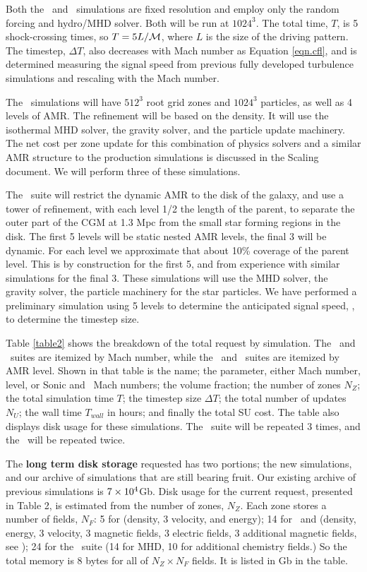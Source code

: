 Both the \nameTurbulence\ and \nameCMB\ simulations are fixed resolution and
employ only the random forcing and hydro/MHD solver.    Both will be
run at $1024^3$.  The total time, $T$, is 5 shock-crossing times, so $T =
5 L/\mathcal{M}$, where $L$ is the size of the driving pattern.  The
timestep, $\Delta T$, also decreases with Mach number as Equation \ref{eqn.cfl},
and is determined measuring the signal speed \vsignal from
previous fully developed turbulence simulations and rescaling with the Mach
number.

The \nameCores\ simulations will have $512^3$ root grid zones and $1024^3$
particles, as well as 4 levels of AMR.  The refinement will be based on the
density.  It will use the isothermal MHD solver, the gravity solver, and the
particle update machinery.  The net cost per zone update for this combination of
physics solvers and a similar AMR structure to the production simulations is
discussed in the Scaling document.  We will perform three of these simulations.

The \nameGalaxies\ suite will restrict the dynamic AMR to the disk of the galaxy, and
use a tower of refinement, with each level 1/2 the length of the parent, to separate the outer
part of the CGM at 1.3 Mpc from the small star forming regions in the disk.  The
first 5 levels will be static nested AMR levels, the final 3 will be dynamic.
For each level we approximate that about 10\% coverage of the parent level.
This is by construction for the first 5, and from experience with similar
simulations for the final 3.  These simulations will use the MHD solver, the
gravity solver, the particle machinery for the star particles.  We have performed a preliminary
simulation using 5 levels to determine the 
anticipated signal speed, \vsignal, to determine the timestep size. 

Table \ref{table2} shows the breakdown of the total request by simulation.  The
\nameTurbulence\ and \nameCMB\ suites are itemized by Mach number, while the
\nameCores\ and \nameGalaxies\ suites are itemized by AMR level.  Shown in that
table is the name; the parameter, either Mach number, level, or Sonic and \alf\
Mach numbers;  the volume fraction; the number of zones $N_Z$; the total
simulation time $T$; the timestep size $\Delta T$; the total number of
updates $N_U$; the wall time $T_{wall}$ in hours; and
finally the total SU cost.  The table also displays disk usage for these
simulations.  The \nameCores\ suite will be repeated 3 times, and the
\nameGalaxies\ will be repeated twice.

The {\bf long term disk storage} requested has two portions; the new
simulations, and our archive of simulations that are still bearing fruit.
Our existing archive of previous simulations is $7\times {10^{4}}$Gb.
Disk usage for the current request, presented in Table 2, is estimated from the number of zones, $N_Z$.  Each zone
stores a number of fields, $N_F$: 5 for \nameTurbulence (density, 3 velocity, and
energy); 14 for \nameCores\ and
\nameCMB (density, energy, 3 velocity, 3 magnetic fields, 3 electric fields, 3
additional magnetic fields, see \citet{Collins10}); 24 for the \nameGalaxies\
suite (14 for MHD, 10 for additional chemistry fields.)  So the total memory is
8 bytes for all of $N_Z\times N_F$ fields.  It is listed in Gb in the table.

